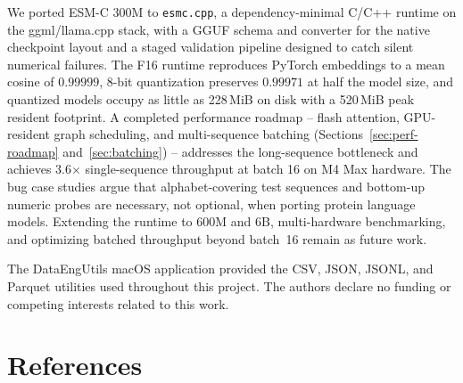 \documentclass{article}
\begin{document}
We ported ESM-C 300M to \texttt{esmc.cpp}, a dependency-minimal C/C++ runtime on the ggml/llama.cpp stack, with a GGUF schema and converter for the native checkpoint layout and a staged validation pipeline designed to catch silent numerical failures. The F16 runtime reproduces PyTorch embeddings to a mean cosine of $0.99999$, 8-bit quantization preserves $0.99971$ at half the model size, and quantized models occupy as little as 228\,MiB on disk with a 520\,MiB peak resident footprint. A completed performance roadmap -- flash attention, GPU-resident graph scheduling, and multi-sequence batching (Sections~\ref{sec:perf-roadmap} and~\ref{sec:batching}) -- addresses the long-sequence bottleneck and achieves 3.6$\times$ single-sequence throughput at batch 16 on M4 Max hardware. The bug case studies argue that alphabet-covering test sequences and bottom-up numeric probes are necessary, not optional, when porting protein language models. Extending the runtime to 600M and 6B, multi-hardware benchmarking, and optimizing batched throughput beyond batch~16 remain as future work.

\begin{ack}
The DataEngUtils macOS application provided the CSV, JSON, JSONL, and Parquet utilities used throughout this project.
The authors declare no funding or competing interests related to this work.
\end{ack}

\section*{References}
\end{document}
